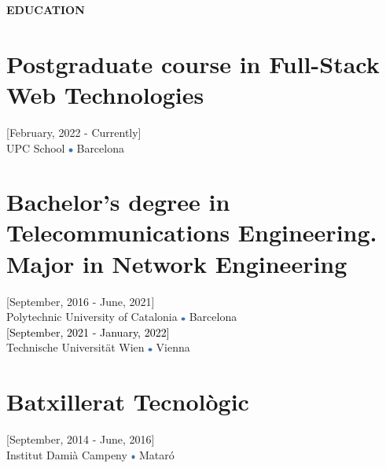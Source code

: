 \documentclass[../main.tex]{subfiles}
\begin{document}
    \vspace*{-0.4cm}
    \textbf{\textcolor{myCV2}{EDUCATION\underline{\hspace{7.62cm}}}}
        \vspace*{-0.3cm}
        
        \section*{Postgraduate course in Full-Stack Web Technologies}
        \vspace*{-0.4cm}
        [February, 2022 - Currently] \\
        UPC School
        \includegraphics[width=0.15cm]{assets/full.png} 
        Barcelona
        
        \vspace*{-0.25cm}
        \section*{Bachelor's degree in Telecommunications Engineering. Major in Network Engineering}
        \vspace*{-0.4cm}
        [September, 2016 - June, 2021] \\
        Polytechnic University of Catalonia 
        \includegraphics[width=0.15cm]{assets/full.png} 
        Barcelona \\
        \textcolor{black}{[September, 2021 - January, 2022]}\\
        Technische Universität Wien
        \includegraphics[width=0.15cm]{assets/full.png} 
        Vienna
        
        \vspace*{-0.25cm}
        \section*{Batxillerat Tecnològic}
        \vspace*{-0.4cm}
        [September, 2014 - June, 2016] \\
        Institut Damià Campeny
        \includegraphics[width=0.15cm]{assets/full.png} 
        Mataró

\end{document}
